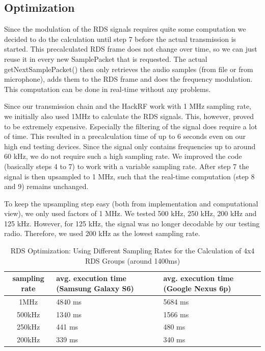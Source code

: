 \subsection{Optimization}
Since the modulation of the RDS signals requires quite some computation we decided to do the calculation until step 7 before the actual transmission is started. This precalculated RDS frame does not change over time, so we can just reuse it in every new SamplePacket that is requested. The actual getNextSamplePacket() then only retrieves the audio samples (from file or from microphone), adds them to the RDS frame and does the frequency modulation. This computation can be done in real-time without any problems. 

Since our transmission chain and the HackRF work with 1 MHz sampling rate, we initially also used 1MHz to calculate the RDS signals. This, however, proved to be extremely expensive. Especially the filtering of the signal does require a lot of time. This resulted in a precalculation time of up to 6 seconds even on our high end testing devices. Since the signal only contains frequencies up to around 60 kHz, we do not require such a high sampling rate. We improved the code (basically steps 4 to 7) to work with a variable sampling rate. After step 7 the signal is then upsampled to 1 MHz, such that the real-time computation (step 8 and 9) remains unchanged.

To keep the upsampling step easy (both from implementation and computational view), we only used factors of 1 MHz. We tested 500 kHz, 250 kHz, 200 kHz and 125 kHz. However, for 125 kHz, the signal was no longer decodable by our testing radio. Therefore, we used 200 kHz as the lowest sampling rate. 


\begin{table}[!htbp]

	\caption{RDS Optimization: Using Different Sampling Rates for the Calculation of 4x4 RDS  Groups (around 1400ms)}
		\label{tab:rds_optimization}
	
	\begin{tabular}{c | p{4cm} | p{4cm} }
		sampling rate &  avg. execution time (Samsung Galaxy S6) & avg. execution time (Google Nexus 6p) \\ \hline
		1MHz	& 4840 ms & 5684 ms \\ \hline 
		500kHz	& 1340 ms & 1566 ms \\ \hline
		250kHz 	& 441 ms  & 480 ms\\ \hline
		200kHz 	& 339 ms  & 340 ms 
		
	\end{tabular}
\end{table}

